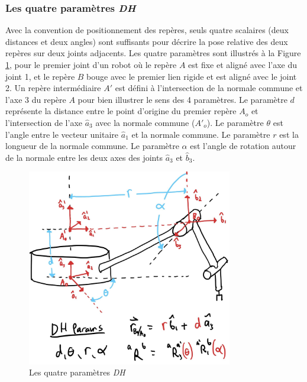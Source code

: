 
\subsubsection{Les quatre paramètres \textit{DH} }
Avec la convention de positionnement des repères, seuls quatre scalaires (deux distances et deux angles) sont suffisants pour décrire la pose relative des deux repères sur deux joints adjacents. Les quatre paramètres sont illustrés à la Figure \ref{fig:dh2}, pour le premier joint d'un robot où le repère $A$ est fixe et aligné avec l'axe du joint 1, et le repère $B$ bouge avec le premier lien rigide et est aligné avec le joint 2. Un repère intermédiaire $A'$ est défini à l'intersection de la normale commune et l'axe 3 du repère $A$ pour bien illustrer le sens des 4 paramètres. Le paramètre $d$ représente la distance entre le point d'origine du premier repère $A_o$ et l'intersection de l'axe $\hat{a}_3$ avec la normale commune ($A'_o$).  Le paramètre $\theta$ est l'angle entre le vecteur unitaire $\hat{a}_1$ et la normale commune. Le paramètre $r$ est la longueur de la normale commune. Le paramètre $\alpha$ est l'angle de rotation autour de la normale entre les deux axes des joints $\hat{a}_3$ et $\hat{b}_3$.
\begin{figure}[H]
	\centering
	\includegraphics[width=0.80\textwidth]{fig/dh2.jpg}
	\caption{Les quatre paramètres \textit{DH}}
	\label{fig:dh2}
\end{figure}


